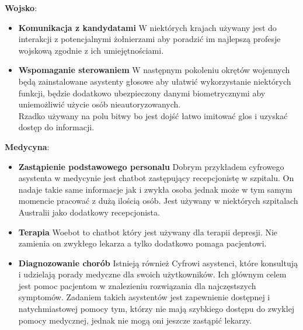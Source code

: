 \textbf{Wojsko}:

\begin{itemize}
	\item \textbf{Komunikacja z kandydatami} W niektórych krajach używany jest do interakcji z potencjalnymi żołnierzami aby poradzić im najlepszą profesje wojskową zgodnie z ich umiejętnościami. 
	\item \textbf{Wspomaganie sterowaniem} W następnym pokoleniu okrętów wojennych będą zainstalowane asystenty głosowe aby ułatwić wykorzystanie niektórych funkcji, będzie dodatkowo ubezpieczony danymi biometrycznymi aby uniemożliwić użycie osób nieautoryzowanych. \\
	
	Rzadko używany na polu bitwy bo jest dojść łatwo imitować glos i uzyskać dostęp do informacji. \\
\end{itemize}

\textbf{Medycyna}:

\begin{itemize}
	\item \textbf{Zastąpienie podstawowego personalu} Dobrym przykładem cyfrowego asystenta w medycynie jest chatbot zastępujący recepcjonistę w szpitalu. On nadaje takie same informacje jak i zwykła osoba jednak może w tym samym momencie pracować z dużą ilością osób. Jest używany w niektórych szpitalach Australii jako dodatkowy recepcjonista. 
	\item \textbf{Terapia} Woebot to chatbot który jest używany dla terapii depresji. Nie zamienia on zwykłego lekarza a tylko dodatkowo pomaga pacjentowi. 
	\item \textbf{Diagnozowanie chorób} Istnieją również Cyfrowi asystenci, które konsultują i udzielają porady medyczne dla swoich użytkowników. Ich głównym celem jest pomoc pacjentom w znalezieniu rozwiązania dla najczęstszych symptomów. Zadaniem takich asystentów jest zapewnienie dostępnej i natychmiastowej pomocy tym, którzy nie mają szybkiego dostępu do zwyklej pomocy medycznej, jednak nie mogą oni jeszcze zastąpić lekarzy. \\
\end{itemize}
